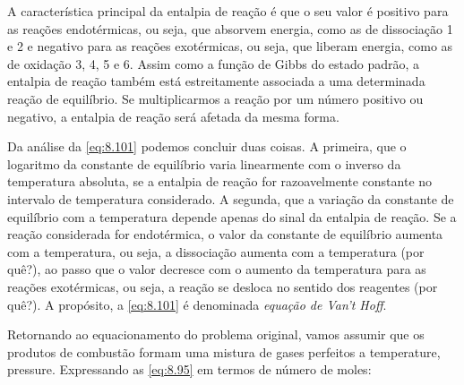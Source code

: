     A característica principal da entalpia de reação é que o seu valor é
    positivo para as reações endotérmicas, ou seja, que absorvem energia, como
    as de dissociação 1 e 2 e negativo para as reações exotérmicas, ou seja,
    que liberam energia, como as de oxidação 3, 4, 5 e 6. Assim como a função
    de Gibbs do estado padrão, a entalpia de reação também está estreitamente
    associada a uma determinada reação de equilíbrio. Se multiplicarmos a
    reação por um número positivo ou negativo, a entalpia de reação será
    afetada da mesma forma.

    Da análise da \cref{eq:8.101} podemos concluir duas coisas. A primeira, que
    o logaritmo da constante de equilíbrio varia linearmente com o inverso da
    temperatura absoluta, se a entalpia de reação for razoavelmente constante
    no intervalo de temperatura considerado. A segunda, que a variação da
    constante de equilíbrio com a temperatura depende apenas do sinal da
    entalpia de reação. Se a reação considerada for endotérmica, o valor da
    constante de equilíbrio aumenta com a temperatura, ou seja, a dissociação
    aumenta com a temperatura (por quê?), ao passo que o valor decresce com o
    aumento da temperatura para as reações exotérmicas, ou seja, a reação se
    desloca no sentido dos reagentes (por quê?). A propósito, a \cref{eq:8.101}
    é denominada \emph{equação de Van't Hoff}.

    Retornando ao equacionamento do problema original, vamos assumir que os
    produtos de combustão formam uma mistura de gases perfeitos a
    \gls{temperature}, \gls{pressure}. Expressando as \cref{eq:8.95} em termos
    de número de moles:

